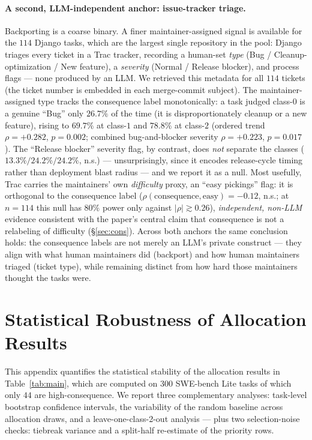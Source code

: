 \documentclass{article}
\begin{document}
\paragraph{A second, LLM-independent anchor: issue-tracker triage.}
Backporting is a coarse binary. A finer maintainer-assigned signal is
available for the $114$ Django tasks, which are the largest single
repository in the pool: Django triages every ticket in a Trac tracker,
recording a human-set \emph{type} (Bug / Cleanup-optimization / New
feature), a \emph{severity} (Normal / Release blocker), and process
flags --- none produced by an LLM. We retrieved this metadata for all
$114$ tickets (the ticket number is embedded in each merge-commit
subject). The maintainer-assigned type tracks the consequence label
monotonically: a task judged class-$0$ is a genuine ``Bug'' only
$26.7\%$ of the time (it is disproportionately cleanup or a new
feature), rising to $69.7\%$ at class-$1$ and $78.8\%$ at class-$2$
(ordered trend $\rho = +0.282$, $p = 0.002$; combined bug-and-blocker
severity $\rho = +0.223$, $p = 0.017$). The ``Release blocker''
severity flag, by contrast, does \emph{not} separate the classes
($13.3\% / 24.2\% / 24.2\%$, n.s.) --- unsurprisingly, since it
encodes release-cycle timing rather than deployment blast radius ---
and we report it as a null. Most usefully, Trac carries the
maintainers' own \emph{difficulty} proxy, an ``easy pickings'' flag:
it is orthogonal to the consequence label
($\rho(\mathrm{consequence}, \mathrm{easy}) = -0.12$, n.s.; at
$n{=}114$ this null has $80\%$ power only against $|\rho| \gtrsim 0.26$),
\emph{independent, non-LLM} evidence consistent with the paper's
central claim that consequence is not a relabeling of difficulty
(\S\ref{sec:cons}). Across both anchors the same conclusion holds:
the consequence labels are not merely an LLM's private construct ---
they align with what human maintainers did (backport) and how human
maintainers triaged (ticket type), while remaining distinct from how
hard those maintainers thought the tasks were.

\section{Statistical Robustness of Allocation Results}
\label{app:bootstrap}

This appendix quantifies the statistical stability of the allocation
results in Table~\ref{tab:main}, which are computed on $300$ SWE-bench
Lite tasks of which only $44$ are high-consequence. We report three
complementary analyses: task-level bootstrap confidence intervals, the
variability of the random baseline across allocation draws, and a
leave-one-class-2-out analysis --- plus two selection-noise checks:
tiebreak variance and a split-half re-estimate of the priority rows.
\end{document}
